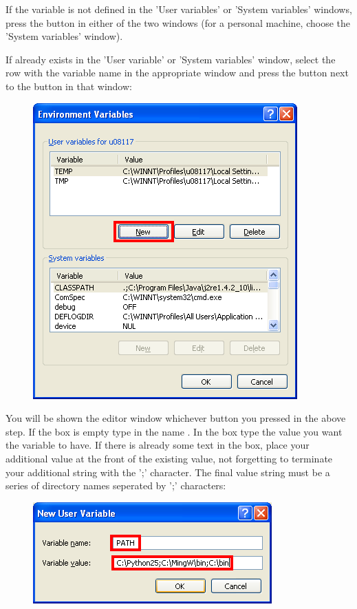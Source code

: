 \documentclass{manual}
\begin{document}
\pagebreak

If the  variable is not defined in the 'User variables' or 'System variables' windows,
press the  button in either of the two windows (for a personal machine, choose the 'System variables' window).

If  already exists in the 'User variable' or 'System variables' window,
select the row with the  variable name in the appropriate window
and press the  button next to the  button in that window:
\begin{figure}[ht]
  \centerline{\includegraphics[scale=0.5]{installgraphics/winsetpath5.png}}
  \label{fig:winsetpath5}
\end{figure}


You will be shown the editor window whichever button you pressed in the above step. If the  box is empty
type in the name .  In the  box type the value you want the  variable to have.  If there
is already some text in the box, place your additional value at the front of the existing value, not forgetting to terminate your additional
string with the ';' character. The final value string must be a series of directory names seperated by ';' characters:
\begin{figure}[ht]
  \centerline{\includegraphics[scale=0.75]{installgraphics/winsetpath6.png}}
  \label{fig:winsetpath6}
\end{figure}
\end{document}
